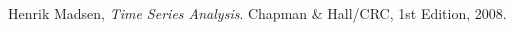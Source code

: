 \begin{thebibliography}{9}

  Henrik Madsen,
  \emph{Time Series Analysis}.
  Chapman \& Hall/CRC,
  1st Edition,
  2008.

\end{thebibliography}
